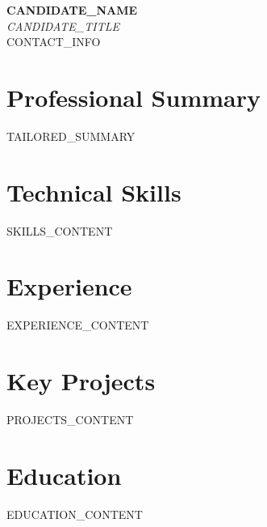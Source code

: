 \documentclass[letterpaper,10pt]{article}
\newcommand{\resumeSubHeadingListStart}{\begin{itemize}[leftmargin=0.15in, label={}]}
\newcommand{\resumeSubHeadingListEnd}{\end{itemize}}
\begin{document}
\begin{center}
    \textbf{\Huge \scshape {{ CANDIDATE_NAME }}} \\ \vspace{2pt}
    \small \textit{{{ CANDIDATE_TITLE }}} \\ \vspace{3pt}
    \small {{ CONTACT_INFO }}
\end{center}

\section{Professional Summary}
\small{
    {{ TAILORED_SUMMARY }}
}

\section{Technical Skills}
\begin{itemize}[leftmargin=0.15in, label={}]
    \small{\item{
        {{ SKILLS_CONTENT }}
    }}
\end{itemize}

\section{Experience}
\resumeSubHeadingListStart

{{ EXPERIENCE_CONTENT }}

\resumeSubHeadingListEnd

\section{Key Projects}
\resumeSubHeadingListStart

{{ PROJECTS_CONTENT }}

\resumeSubHeadingListEnd

\section{Education}
\resumeSubHeadingListStart

{{ EDUCATION_CONTENT }}

\resumeSubHeadingListEnd

\end{document}
